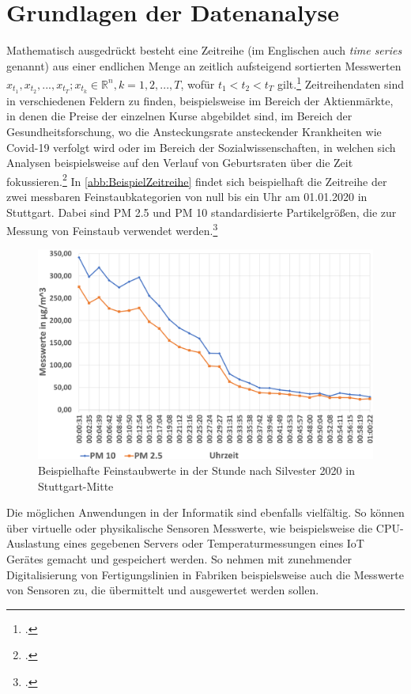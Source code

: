 \section{Grundlagen der Datenanalyse}\label{chap:GrundlagenDatenanalyse}

Mathematisch ausgedrückt besteht eine Zeitreihe (im Englischen auch \textit{time series} genannt) aus einer endlichen Menge an zeitlich aufsteigend sortierten Messwerten $x_{t_1},x_{t_2},...,x_{t_T};  x_{t_k} \in \mathbb{R}^n, k=1,2,...,T$, wofür $t_1 < t_2 < t_T $ gilt.\footcite[Vgl.][1]{Deistler.2018b} 
Zeitreihendaten sind in verschiedenen Feldern zu finden, beispielsweise im Bereich der Aktienmärkte, in denen die Preise der einzelnen Kurse abgebildet sind, im Bereich der Gesundheitsforschung, wo die Ansteckungsrate ansteckender Krankheiten wie Covid-19 verfolgt wird oder im Bereich der Sozialwissenschaften, in welchen sich Analysen beispielsweise auf den Verlauf von Geburtsraten über die Zeit fokussieren.\footcite[Vgl.][1]{Shumway.2017} 
In \autoref{abb:BeispielZeitreihe} findet sich beispielhaft die Zeitreihe der zwei messbaren Feinstaubkategorien von null bis ein Uhr am 01.01.2020 in Stuttgart. Dabei sind \ac{PM} 2.5 und \ac{PM} 10 standardisierte Partikelgrößen, die zur Messung von Feinstaub verwendet werden.\footcite[Vgl.][]{EnvironmentalProtectionAgency.o.J.}

\begin{figure}[H]
\centering
\includegraphics[height=0.4\textheight]{graphics/Feinstaub-Stuttgart.png}
\caption{Beispielhafte Feinstaubwerte in der Stunde nach Silvester 2020 in Stuttgart-Mitte}
\label{abb:BeispielZeitreihe}
\end{figure}

Die möglichen Anwendungen in der Informatik sind ebenfalls vielfältig. So können über virtuelle oder physikalische Sensoren Messwerte, wie beispielsweise die \ac{CPU}-Auslastung eines gegebenen Servers oder Temperaturmessungen eines \ac{IoT} Gerätes gemacht und gespeichert werden. So nehmen mit zunehmender Digitalisierung von Fertigungslinien in Fabriken beispielsweise auch die Messwerte von Sensoren zu, die übermittelt und ausgewertet werden sollen.

